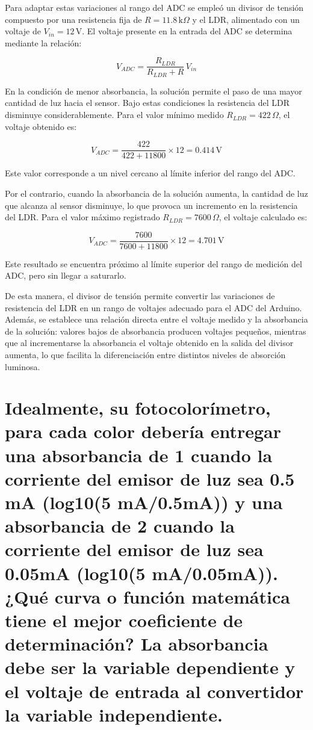 Para adaptar estas variaciones al rango del ADC se empleó un divisor de tensión
compuesto por una resistencia fija de $R = 11.8\,\text{k}\Omega$ y el LDR,
alimentado con un voltaje de $V_{in} = 12\,\text{V}$. El voltaje presente en la
entrada del ADC se determina mediante la relación:

\[
V_{ADC} = \frac{R_{LDR}}{R_{LDR}+R}\,V_{in}
\]

En la condición de menor absorbancia, la solución permite el paso de una mayor
cantidad de luz hacia el sensor. Bajo estas condiciones la resistencia del LDR
disminuye considerablemente. Para el valor mínimo medido
$R_{LDR} = 422\,\Omega$, el voltaje obtenido es:

\[
V_{ADC} = \frac{422}{422 + 11800}\times 12 = 0.414\,\text{V}
\]

Este valor corresponde a un nivel cercano al límite inferior del rango del ADC.

Por el contrario, cuando la absorbancia de la solución aumenta, la cantidad de
luz que alcanza al sensor disminuye, lo que provoca un incremento en la
resistencia del LDR. Para el valor máximo registrado
$R_{LDR} = 7600\,\Omega$, el voltaje calculado es:

\[
V_{ADC} = \frac{7600}{7600 + 11800}\times 12 = 4.701\,\text{V}
\]

Este resultado se encuentra próximo al límite superior del rango de medición
del ADC, pero sin llegar a saturarlo.

De esta manera, el divisor de tensión permite convertir las variaciones de
resistencia del LDR en un rango de voltajes adecuado para el ADC del Arduino.
Además, se establece una relación directa entre el voltaje medido y la
absorbancia de la solución: valores bajos de absorbancia producen voltajes
pequeños, mientras que al incrementarse la absorbancia el voltaje obtenido en
la salida del divisor aumenta, lo que facilita la diferenciación entre distintos
niveles de absorción luminosa.

\section{Idealmente, su fotocolorímetro, para cada color debería entregar una absorbancia de 1 cuando
la corriente del emisor de luz sea 0.5 mA (log10(5 mA/0.5mA)) y una absorbancia de 2 cuando la
corriente del emisor de luz sea 0.05mA (log10(5 mA/0.05mA)). ¿Qué curva o función matemática
tiene el mejor coeficiente de determinación? La absorbancia debe ser la variable dependiente y el
voltaje de entrada al convertidor la variable independiente.}


